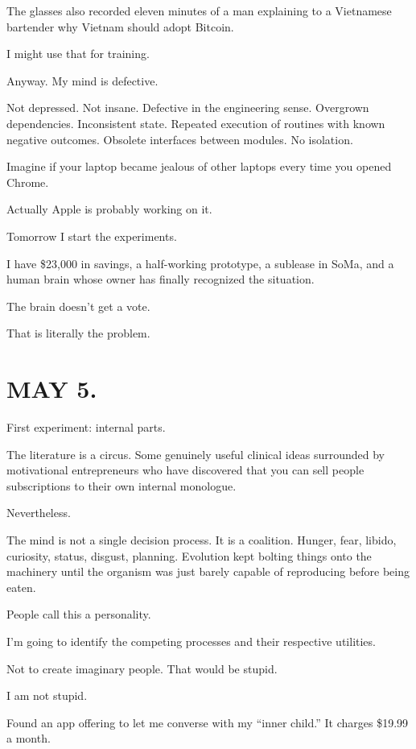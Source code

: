 \documentclass[11pt,oneside]{book}
\begin{document}
The glasses also recorded eleven minutes of a man explaining to a Vietnamese bartender why Vietnam should adopt Bitcoin.

I might use that for training.

Anyway. My mind is defective.

Not depressed. Not insane. Defective in the engineering sense. Overgrown dependencies. Inconsistent state. Repeated execution of routines with known negative outcomes. Obsolete interfaces between modules. No isolation.

Imagine if your laptop became jealous of other laptops every time you opened Chrome.

Actually Apple is probably working on it.

Tomorrow I start the experiments.

I have \$23,000 in savings, a half-working prototype, a sublease in SoMa, and a human brain whose owner has finally recognized the situation.

The brain doesn't get a vote.

That is literally the problem.

\section*{MAY 5.}

First experiment: internal parts.

The literature is a circus. Some genuinely useful clinical ideas surrounded by motivational entrepreneurs who have discovered that you can sell people subscriptions to their own internal monologue.

Nevertheless.

The mind is not a single decision process. It is a coalition. Hunger, fear, libido, curiosity, status, disgust, planning. Evolution kept bolting things onto the machinery until the organism was just barely capable of reproducing before being eaten.

People call this a personality.

I'm going to identify the competing processes and their respective utilities.

Not to create imaginary people. That would be stupid.

I am not stupid.

Found an app offering to let me converse with my ``inner child.'' It charges \$19.99 a month.
\end{document}
